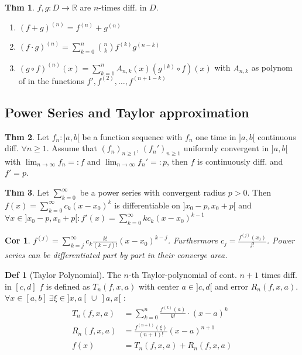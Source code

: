\documentclass[a4paper, 10pt]{article}
\newtheorem*{corollary}{Cor}
\theoremstyle{definition}
\newtheorem*{theorem}{Thm}
\newtheorem*{definition}{Def}
\theoremstyle{named}
\newcommand{\R}{\mathbb{R}}
\begin{document}
\begin{theorem}
    $f, g: D \to \R$ are $n$-times diff. in $D$.
    \begin{enumerate}
        \item $(f + g)^{(n)} = f^{(n)} + g^{(n)}$
        \item $(f \cdot g)^{(n)} = \sum_{k = 0}^n \binom{n}{k}f^{(k)}g^{(n-k)}$
        \item $(g \circ f)^{(n)}(x) = \sum_{k=1}^n A_{n,k}(x)(g^{(k)} \circ f)(x)$ with $A_{n,k}$ as polynom of in the functions $f', f^{(2)}, \ldots, f^{(n+1-k)}$
    \end{enumerate}
\end{theorem}

\subsection{Power Series and Taylor approximation}
\begin{theorem}
    Let $f_n : ]a, b[$ be a function sequence with $f_n$ one time in $]a, b[$ continuous diff. $\forall n \geq 1$. Assume that $(f_n)_{n \geq 1}$, $(f_n')_{n \geq 1}$ uniformly convergent in $]a, b[$ with $\lim_{n \to \infty} f_n =: f$ and $\lim_{n \to \infty} f_n' =: p$, then $f$ is continuously diff. and $f' = p$.
\end{theorem}

\begin{theorem}
    Let $\sum_{k = 0}^\infty$ be a power series with convergent radius $p > 0$. Then $f(x) = \sum_{k = 0}^\infty c_k(x - x_0)^k$ is differentiable on $]x_0 - p , x_0 + p[$ and $\forall x \in ]x_0 - p , x_0 + p[: f'(x) = \sum_{k = 0}^\infty kc_k(x - x_0)^{k - 1}$
\end{theorem}
\begin{corollary}
    $f^(j) = \sum_{k = j}^\infty c_k \frac{k!}{(k-j)!}(x - x_0)^{k - j}$. Furthermore $c_j = \frac{f^(j)(x_0)}{j!}$. Power series can be differentiated part by part in their converge area.
\end{corollary}

\begin{definition}[Taylor Polynomial]
    The $n$-th Taylor-polynomial of cont. $n + 1$ times diff. in $[c, d]$ $f$ is defined as $T_n(f, x, a)$ with center $a \in ]c, d[$ and error $R_n(f, x, a)$. $\forall x \in [a, b] \ \exists \xi \in ]x, a[ \ \cup \ ]a, x[$ : 
    \begin{align*}
        T_n(f, x, a) &= \sum_{k = 0}^n \frac{f^{(k)}(a)}{k!} \cdot (x - a)^k \\
        R_n(f, x, a) &= \frac{f^(n+1)(\xi)}{(n + 1)!}(x-a)^{n+1} \\
        f(x) &= T_n(f, x, a) + R_n(f, x, a)
    \end{align*}
\end{definition}
\end{document}

